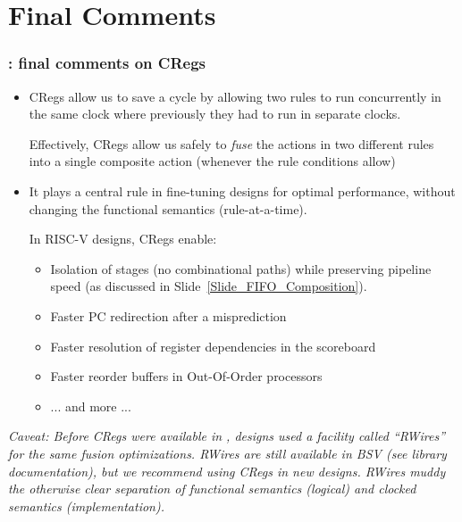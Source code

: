 \section{Final Comments}

\begin{frame}[fragile]
\frametitle{{\BSV}: final comments on CRegs}

\footnotesize

\begin{itemize}

 \item CRegs allow us to save a cycle by allowing two rules to run
       concurrently in the same clock where previously they had to run
       in separate clocks.

       \vspace{1ex}

       Effectively, CRegs allow us safely to \emph{fuse} the actions
       in two different rules into a single composite action (whenever
       the rule conditions allow)

 \item It plays a central rule in fine-tuning {\BSV} designs for
       optimal performance, without changing the functional semantics
       (rule-at-a-time).

       \vspace{1ex}

       In RISC-V designs, CRegs enable:
       \begin{itemize}\footnotesize

         \item Isolation of stages (no combinational paths) while
               preserving pipeline speed (as discussed in
               Slide~\ref{Slide_FIFO_Composition}).

         \item Faster PC redirection after a misprediction
         \item Faster resolution of register dependencies in the scoreboard
         \item Faster reorder buffers in Out-Of-Order processors
         \item ... and more ...
       \end{itemize}

\end{itemize}

\PAUSE{\vspace*{5ex}}

 \emph{Caveat: Before CRegs were available in {\BSV}, designs used a
       facility called ``RWires'' for the same fusion optimizations.
       RWires are still available in BSV (see library documentation),
       but we recommend using CRegs in new designs.  RWires muddy the
       otherwise clear separation of functional semantics (logical)
       and clocked semantics (implementation).}

\end{frame}







